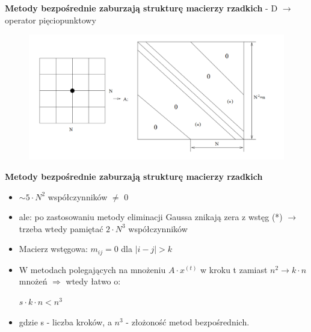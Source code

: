 \begin{frame}{}
  \textbf{Metody bezpośrednie zaburzają strukturę macierzy rzadkich}
   - D $\rightarrow$ operator pięciopunktowy
  \begin{figure}
    \centering
    \includegraphics[height=0.75\textheight, width=1.1\textwidth]{img/12/iteracja1}
  \end{figure}
\end{frame}

\begin{frame}{}
  \begin{block}{\textbf{Metody bezpośrednie zaburzają strukturę macierzy rzadkich}}
    \begin{itemize}
      \item{$\sim 5 \cdot N^2$ współczynników $\neq$ 0}
      \item{ale: po zastosowaniu metody eliminacji Gaussa znikają zera z wstęg
      \newline (*) $\rightarrow$ trzeba wtedy pamiętać $2 \cdot N^3$ współczynników}
      \item{Macierz wstęgowa: $m_{ij}=0$ dla $|i-j|>k$}
      \item W metodach polegających na mnożeniu $A \cdot x^{(t)}$ w kroku t zamiast $n^2 \rightarrow k \cdot n$ mnożeń $\Rightarrow$ wtedy łatwo o:
      \begin{center}
      $s \cdot k \cdot n<n^3$ %
      \end{center}
      \item gdzie s - liczba kroków, a $n^3$ - złożoność metod bezpośrednich.
    \end{itemize}
  \end{block}
\end{frame}
